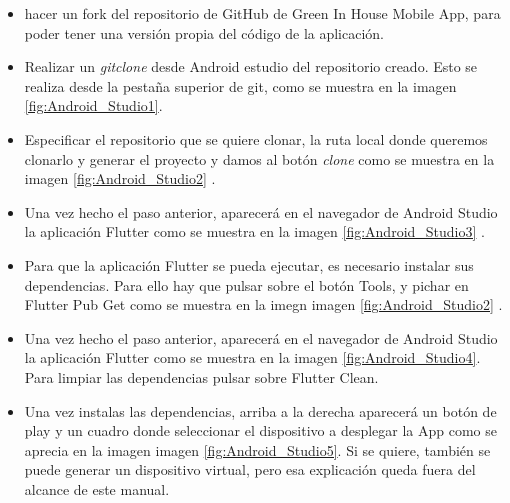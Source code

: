     \begin{itemize}
        \item hacer un fork del repositorio de GitHub de Green In House Mobile App, para poder tener una versión propia del código de la aplicación. 
        \item Realizar un \textit{gitclone} desde Android estudio del repositorio creado. Esto se realiza desde la pestaña superior de git, como se muestra en la imagen \ref{fig:Android_Studio1}.
        \item Especificar el repositorio que se quiere clonar, la ruta local donde queremos clonarlo y generar el proyecto y damos al botón \textit{clone} como se muestra en la imagen \ref{fig:Android_Studio2} .
        \item Una vez hecho el paso anterior, aparecerá en el navegador de Android Studio la aplicación Flutter como se muestra en la imagen \ref{fig:Android_Studio3} .
        \item Para que la aplicación Flutter se pueda ejecutar, es necesario instalar sus dependencias. Para ello hay que pulsar sobre el botón Tools, y pichar en Flutter Pub Get como se muestra en la imegn imagen \ref{fig:Android_Studio2} .
        \item Una vez hecho el paso anterior, aparecerá en el navegador de Android Studio la aplicación Flutter como se muestra en la imagen \ref{fig:Android_Studio4}. Para limpiar las dependencias pulsar sobre Flutter Clean.
        \item Una vez instalas las dependencias, arriba a la derecha aparecerá un botón de play y un cuadro donde seleccionar el dispositivo a desplegar la App como se aprecia en la imagen imagen \ref{fig:Android_Studio5}. Si se quiere, también se puede generar un dispositivo virtual, pero esa explicación queda fuera del alcance de este manual.
    \end{itemize}

        
